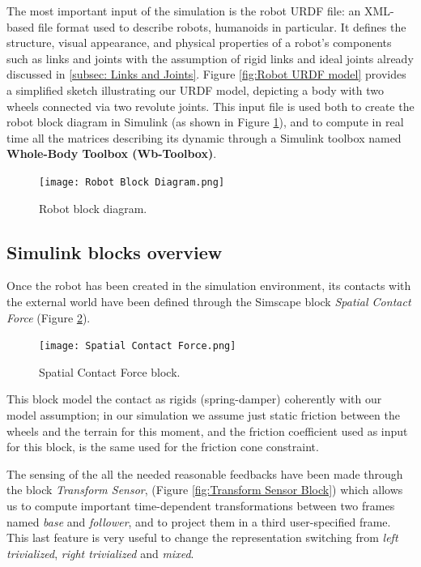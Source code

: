 The most important input of the simulation is the robot URDF file: an XML-based file format used to describe robots, humanoids in particular. It defines the structure, visual appearance, and physical properties of a robot's components such as links and joints with the assumption of rigid links and ideal joints already discussed in \cref{subsec: Links and Joints}.
Figure \ref{fig:Robot URDF model} provides a simplified sketch illustrating our URDF model, depicting a body with two wheels connected via two revolute joints. 
This input file is used both to create the robot block diagram in Simulink (as shown in Figure \ref{fig:Robot block diagram}), and to compute in real time all the matrices describing its dynamic through a Simulink toolbox named \textbf{Whole-Body Toolbox (Wb-Toolbox)}.

\begin{figure}
    \centering
    \texttt{[image: Robot Block Diagram.png]}
    \caption{Robot block diagram.}
    \label{fig:Robot block diagram}
\end{figure}

\subsection{Simulink blocks overview}
\label{subsec:Simulink blocks overview}

Once the robot has been created in the simulation environment, its contacts with the external world have been defined through the Simscape block \textit{Spatial Contact Force} (Figure \ref{fig:Spatial Contact Force block}).

\begin{figure}
    \centering
    \texttt{[image: Spatial Contact Force.png]}
    \caption{Spatial Contact Force block.}
    \label{fig:Spatial Contact Force block}
\end{figure}

This block model the contact as rigids (spring-damper) coherently with our model assumption; in our simulation we assume just static friction between the wheels and the terrain for this moment, and the friction coefficient used as input for this block, is the same used for the friction cone constraint. 

The sensing of the all the needed reasonable feedbacks have been made through the block \textit{Transform Sensor}, (Figure \ref{fig:Transform Sensor Block}) which allows us to compute important time-dependent transformations between two frames named \textit{base} and \textit{follower}, and to project them in a third user-specified frame.
This last feature is very useful to change the representation switching from \textit{left trivialized}, \textit{right trivialized} and \textit{mixed}.

